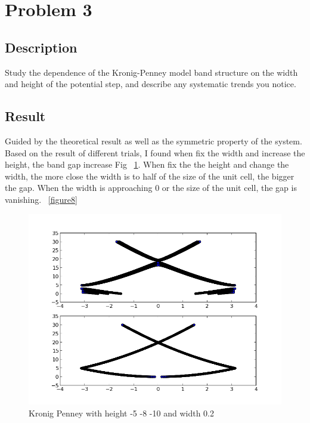\documentclass[11pt,letterpaper]{article}
\begin{document}
  
\section{Problem 3}
\subsection{Description}
Study the dependence of the Kronig-Penney model band structure on the width and height of the potential step, and describe any systematic trends you notice.


\subsection{Result}

Guided by the theoretical result as well as the symmetric property of the system. Based on the result of different trials, I found when fix the width and increase the height, the band gap increase Fig ~\ref{figure7}. When fix the the height and change the width, the more close the width is to half of the size of the unit cell, the bigger the gap. When the width is approaching 0 or the size of the unit cell, the gap is vanishing. ~\ref{figure8} 



\begin{figure}
\begin{center}
\includegraphics[width=0.8\linewidth,angle=0]{kp.png}
\caption{Kronig Penney with height -5 -8 -10 and width 0.2}
\label{figure7}
\end{center}
\end{figure}
\end{document}
